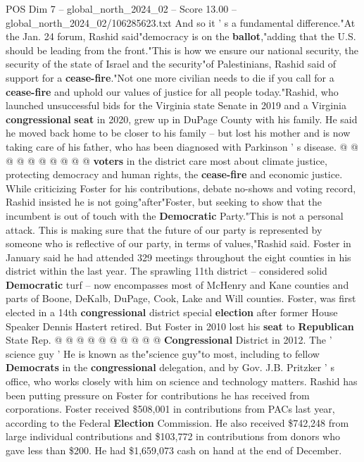 \begin{textsample}{POS Dim 7 – global\_north\_2024\_02 – Score 13.00 – global\_north\_2024\_02/106285623.txt}
And so it ' s a fundamental difference."At the Jan. 24 forum, Rashid said"democracy is on the \textbf{ballot},"adding that the U.S. should be leading from the front."This is how we ensure our national security, the security of the state of Israel and the security"of Palestinians, Rashid said of support for a \textbf{cease-fire}."Not one more civilian needs to die if you call for a \textbf{cease-fire} and uphold our values of justice for all people today."Rashid, who launched unsuccessful bids for the Virginia state Senate in 2019 and a Virginia \textbf{congressional} \textbf{seat} in 2020, grew up in DuPage County with his family.
He said he moved back home to be closer to his family -- but lost his mother and is now taking care of his father, who has been diagnosed with Parkinson ' s disease. @ @ @ @ @ @ @ @ @ @ \textbf{voters} in the district care most about climate justice, protecting democracy and human rights, the \textbf{cease-fire} and economic justice.
While criticizing Foster for his contributions, debate no-shows and voting record, Rashid insisted he is not going"after"Foster, but seeking to show that the incumbent is out of touch with the \textbf{Democratic} Party."This is not a personal attack.
This is making sure that the future of our party is represented by someone who is reflective of our party, in terms of values,"Rashid said.
Foster in January said he had attended 329 meetings throughout the eight counties in his district within the last year.
The sprawling 11th district -- considered solid \textbf{Democratic} turf -- now encompasses most of McHenry and Kane counties and parts of Boone, DeKalb, DuPage, Cook, Lake and Will counties.
Foster, was first elected in a 14th \textbf{congressional} district special \textbf{election} after former House Speaker Dennis Hastert retired.
But Foster in 2010 lost his \textbf{seat} to \textbf{Republican} State Rep. @ @ @ @ @ @ @ @ @ @ \textbf{Congressional} District in 2012.
The ' science guy ' He is known as the"science guy"to most, including to fellow \textbf{Democrats} in the \textbf{congressional} delegation, and by Gov.
J.B.
Pritzker ' s office, who works closely with him on science and technology matters.
Rashid has been putting pressure on Foster for contributions he has received from corporations.
Foster received \$508,001 in contributions from PACs last year, according to the Federal \textbf{Election} Commission.
He also received \$742,248 from large individual contributions and \$103,772 in contributions from donors who gave less than \$200.
He had \$1,659,073 cash on hand at the end of December.

\end{textsample}

